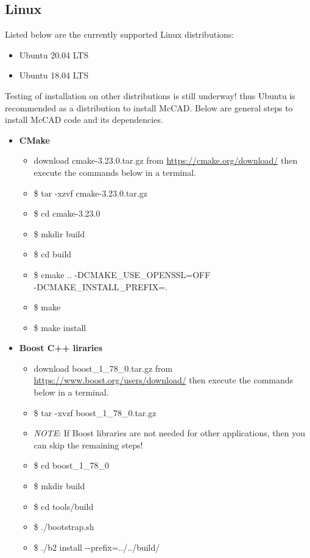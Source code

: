 \documentclass[12pt, a4paper, titlepage]{article}
\begin{document}
  \subsection{Linux}
    Listed below are the currently supported Linux distributions:
    \begin{itemize}
  	  \item Ubuntu 20.04 LTS
  	  \item Ubuntu 18.04 LTS
    \end{itemize} 
    Testing of installation on other distributions is still underway! thus Ubuntu is recommended as a distribution to install McCAD. Below are general steps to install McCAD code and its dependencies.
    \begin{itemize}
  	  \item \textbf{CMake}
  	  \begin{itemize}
		\item download cmake-3.23.0.tar.gz from \url{https://cmake.org/download/} then execute the commands below in a terminal.
		\item \$ tar -xzvf cmake-3.23.0.tar.gz
		\item \$ cd cmake-3.23.0
		\item \$ mkdir build
		\item \$ cd build
		\item \$ cmake .. -DCMAKE\_USE\_OPENSSL=OFF \\-DCMAKE\_INSTALL\_PREFIX=.
		\item \$ make
		\item \$ make install
  	  \end{itemize}
      \item \textbf{Boost C++ liraries}
      \begin{itemize}
    	\item download boost\_1\_78\_0.tar.gz from \url{https://www.boost.org/users/download/} then execute the commands below in a terminal.
    	\item \$ tar -xvzf boost\_1\_78\_0.tar.gz
    	\item \emph{NOTE}: If Boost libraries are not needed for other applications, then you can skip the remaining steps!
    	\item \$ cd boost\_1\_78\_0
    	\item \$ mkdir build
    	\item \$ cd tools/build
    	\item \$ ./bootstrap.sh
    	\item \$ ./b2 install -\--prefix=../../build/
      \end{itemize}

\end{itemize}
\end{document}

